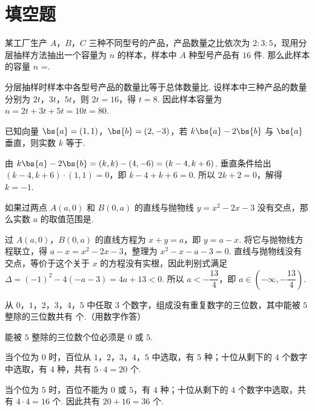 \section{填空题}
\begin{problem}
某工厂生产 \(A\)，\(B\)，\(C\) 三种不同型号的产品，产品数量之比依次为 \(2:3:5\)，现用分层抽样方法抽出一个容量为 \(n\) 的样本，样本中 \(A\) 种型号产品有 \(16\) 件. 那么此样本的容量 \(n\) =\fillinblank{}.
\begin{solution}
分层抽样时样本中各型号产品的数量比等于总体数量比. 设样本中三种产品的数量分别为 \(2t\)，\(3t\)，\(5t\)，则 \(2t=16\)，得 \(t=8\). 因此样本容量为
\(n=2t+3t+5t=10t=80\).
\end{solution}
\end{problem}

\begin{problem}
已知向量 \(\bs{a}=(1,1)\)，\(\bs{b}=(2,-3)\)，若 \(k\bs{a}-2\bs{b}\) 与 \(\bs{a}\) 垂直，则实数 \(k\) 等于\fillinblank{}.
\begin{solution}
由 \(k\bs{a}-2\bs{b}=(k,k)-(4,-6)=(k-4,k+6)\). 垂直条件给出
\((k-4,k+6)\cdot(1,1)=0\)，即 \(k-4+k+6=0\). 所以 \(2k+2=0\)，解得 \(k=-1\).
\end{solution}
\end{problem}

\begin{problem}
如果过两点 \(A(a,0)\) 和 \(B(0,a)\) 的直线与抛物线 \(y = x^{2} - 2x - 3\) 没有交点，那么实数 \(a\) 的取值范围是\fillinblank{}.
\begin{solution}
过 \(A(a,0)\)，\(B(0,a)\) 的直线方程为 \(x+y=a\)，即 \(y=a-x\). 将它与抛物线方程联立，得
\(a-x=x^2-2x-3\)，整理为 \(x^2-x-a-3=0\). 直线与抛物线没有交点，等价于这个关于 \(x\) 的方程没有实根，因此判别式满足
\(\Delta=(-1)^2-4(-a-3)=4a+13<0\). 所以 \(a< -\dfrac{13}{4}\)，即 \(a\in\left(-\infty,-\dfrac{13}{4}\right)\).
\end{solution}
\end{problem}

\begin{problem}
从 \(0\)，\(1\)，\(2\)，\(3\)，\(4\)，\(5\) 中任取 \(3\) 个数字，组成没有重复数字的三位数，其中能被 \(5\) 整除的三位数共有\fillinblank{} 个.（用数字作答）
\begin{solution}
能被 \(5\) 整除的三位数个位必须是 \(0\) 或 \(5\).

当个位为 \(0\) 时，百位从 \(1\)，\(2\)，\(3\)，\(4\)，\(5\) 中选取，有 \(5\) 种；十位从剩下的 \(4\) 个数字中选取，有 \(4\) 种，共有 \(5\cdot4=20\) 个.

当个位为 \(5\) 时，百位不能为 \(0\) 或 \(5\)，有 \(4\) 种；十位从剩下的 \(4\) 个数字中选取，共有 \(4\cdot4=16\) 个. 因此共有 \(20+16=36\) 个.
\end{solution}
\end{problem}

